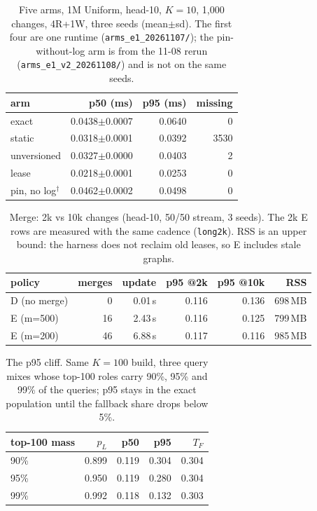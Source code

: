 \begin{table}[t]\centering\footnotesize
\caption{Five arms, 1M Uniform, head-10, $K{=}10$, 1{,}000 changes, 4R+1W, three seeds (mean$\pm$sd). The first four are one runtime (\texttt{arms\_e1\_20261107/}); the pin-without-log arm is from the 11-08 rerun (\texttt{arms\_e1\_v2\_20261108/}) and is not on the same seeds.}
\label{tab:arms}
\begin{tabular}{@{}lrrr@{}}\toprule
arm & p50 (ms) & p95 (ms) & missing \\\midrule
exact & 0.0438$\pm$0.0007 & 0.0640 & 0 \\
static & 0.0318$\pm$0.0001 & 0.0392 & 3530 \\
unversioned & 0.0327$\pm$0.0000 & 0.0403 & 2 \\
lease & 0.0218$\pm$0.0001 & 0.0253 & 0 \\
pin, no log$^\dagger$ & 0.0462$\pm$0.0002 & 0.0498 & 0 \\
\bottomrule\end{tabular}\end{table}

\begin{table}[t]\centering\footnotesize
\caption{Merge: 2k vs 10k changes (head-10, 50/50 stream, 3 seeds). The 2k E rows are measured with the same cadence (\texttt{long2k}). RSS is an upper bound: the harness does not reclaim old leases, so E includes stale graphs.}
\label{tab:merge}
\begin{tabular}{@{}lrrrrr@{}}\toprule
policy & merges & update & p95 @2k & p95 @10k & RSS \\\midrule
D (no merge) & 0 & 0.01\,s & 0.116 & 0.136 & 698\,MB \\
E (m{=}500) & 16 & 2.43\,s & 0.116 & 0.125 & 799\,MB \\
E (m{=}200) & 46 & 6.88\,s & 0.117 & 0.116 & 985\,MB \\
\bottomrule\end{tabular}\end{table}

\begin{table}[t]\centering\footnotesize
\caption{The p95 cliff. Same $K{=}100$ build, three query mixes whose top-100 roles carry 90\%, 95\% and 99\% of the queries; p95 stays in the exact population until the fallback share drops below 5\%.}
\label{tab:quantile}
\begin{tabular}{@{}lrrrr@{}}\toprule
top-100 mass & $p_L$ & p50 & p95 & $T_F$ \\\midrule
90\% & 0.899 & 0.119 & 0.304 & 0.304 \\
95\% & 0.950 & 0.119 & 0.280 & 0.304 \\
99\% & 0.992 & 0.118 & 0.132 & 0.303 \\
\bottomrule\end{tabular}\end{table}

